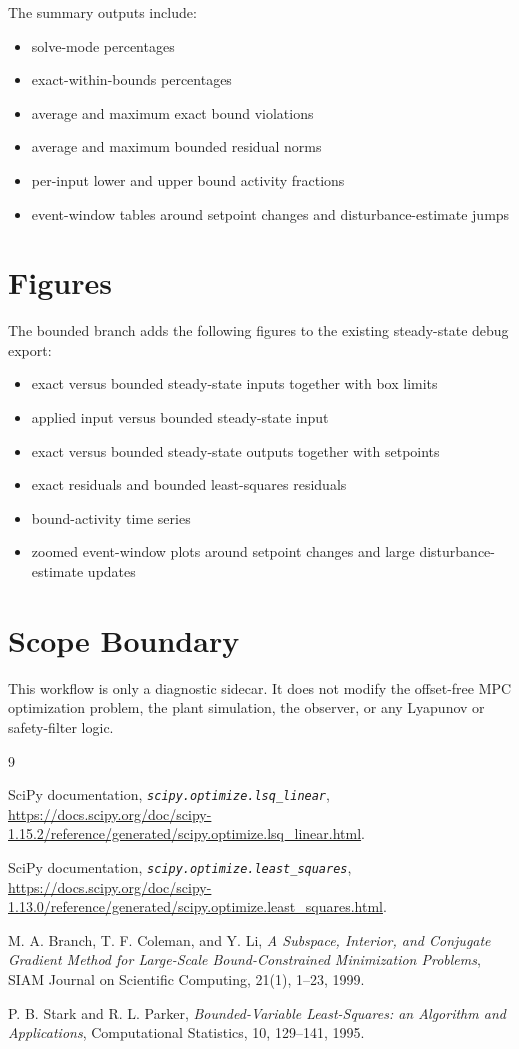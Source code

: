 \documentclass[11pt]{article}
\begin{document}
The summary outputs include:
\begin{itemize}
\item solve-mode percentages
\item exact-within-bounds percentages
\item average and maximum exact bound violations
\item average and maximum bounded residual norms
\item per-input lower and upper bound activity fractions
\item event-window tables around setpoint changes and disturbance-estimate jumps
\end{itemize}

\section{Figures}

The bounded branch adds the following figures to the existing steady-state debug export:
\begin{itemize}
\item exact versus bounded steady-state inputs together with box limits
\item applied input versus bounded steady-state input
\item exact versus bounded steady-state outputs together with setpoints
\item exact residuals and bounded least-squares residuals
\item bound-activity time series
\item zoomed event-window plots around setpoint changes and large disturbance-estimate updates
\end{itemize}

\section{Scope Boundary}

This workflow is only a diagnostic sidecar. It does not modify the offset-free MPC optimization problem, the plant simulation, the observer, or any Lyapunov or safety-filter logic.

\begin{thebibliography}{9}

SciPy documentation,
\emph{\texttt{scipy.optimize.lsq\_linear}},
\url{https://docs.scipy.org/doc/scipy-1.15.2/reference/generated/scipy.optimize.lsq_linear.html}.

SciPy documentation,
\emph{\texttt{scipy.optimize.least\_squares}},
\url{https://docs.scipy.org/doc/scipy-1.13.0/reference/generated/scipy.optimize.least_squares.html}.

M. A. Branch, T. F. Coleman, and Y. Li,
\emph{A Subspace, Interior, and Conjugate Gradient Method for Large-Scale Bound-Constrained Minimization Problems},
SIAM Journal on Scientific Computing, 21(1), 1--23, 1999.

P. B. Stark and R. L. Parker,
\emph{Bounded-Variable Least-Squares: an Algorithm and Applications},
Computational Statistics, 10, 129--141, 1995.

\end{thebibliography}
\end{document}
